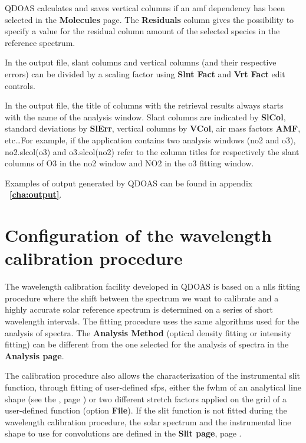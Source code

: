 QDOAS calculates and saves vertical columns if an \gls{amf} dependency has been selected in the \textbf{Molecules} page. The \textbf{Residuals} column gives the possibility to specify a value for the residual column amount of the selected species in the reference spectrum.

In the output file, slant columns and vertical columns (and their respective errors) can be divided by a scaling factor using \textbf{Slnt Fact} and \textbf{Vrt Fact} edit controls.

In the output file, the title of columns with the retrieval results always starts with the name of the analysis window. Slant columns are indicated by \textbf{SlCol}, standard deviations by \textbf{SlErr}, vertical columns by \textbf{VCol}, air mass factors \textbf{AMF}, etc\dots For example, if the application contains two analysis windows (no2 and o3), no2.slcol(o3) and o3.slcol(no2) refer to the column titles for respectively the slant columns of O3 in the no2 window and NO2 in the o3 fitting window.

Examples of output generated by QDOAS can be found in appendix \textbf{~\ref{cha:output}}.

\section{Configuration of the wavelength calibration procedure}\label{sec:conf-wavel-calibr}
The wavelength calibration facility developed in QDOAS is based on a
\gls{nlls} fitting procedure where the shift between the spectrum we
want to calibrate and a highly accurate solar reference spectrum is
determined on a series of short wavelength intervals.  The fitting
procedure uses the same algorithms used for the analysis of
spectra. The \textbf{Analysis Method} (optical density fitting or
intensity fitting) can be different from the one selected for the
analysis of spectra in the \textbf{Analysis page}.

The calibration procedure also allows the characterization of the
instrumental slit function, through fitting of user-defined
\glspl{sfp}, either the \gls{fwhm} of an analytical line shape (see
the \textbf{}, page
\pageref{sec:analyt-line-shap}) or two different stretch factors
applied on the grid of a user-defined function (option \textbf{File}).
If the slit function is not fitted during the wavelength calibration
procedure, the solar spectrum and the instrumental line shape to use
for convolutions are defined in the \textbf{Slit page}, page
\pageref{sec:projects_slit_page}.

